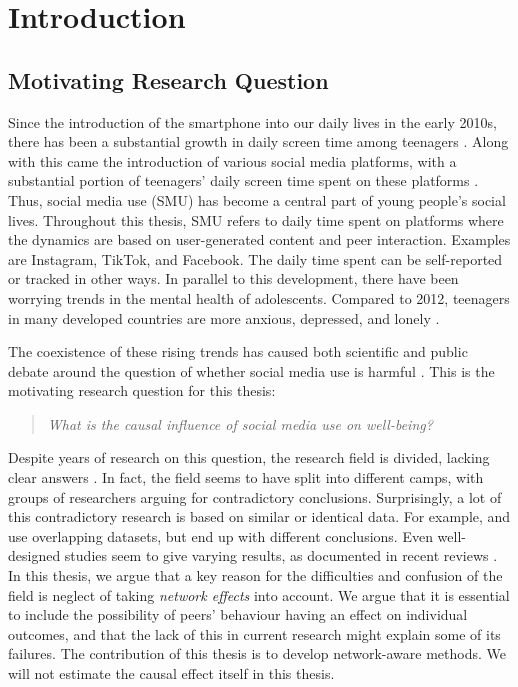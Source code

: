 
\chapter{Introduction}
\label{chap:introduction}
\section{Motivating Research Question}
\label{sec:intro:motivation}
Since the introduction of the smartphone into our daily lives in the early 2010s, there has been a substantial growth in daily screen time among teenagers \parencite{Twenge2018}. Along with this came the introduction of various social media platforms, with a substantial portion of teenagers' daily screen time spent on these platforms \parencite{Twenge2018}. Thus, social media use (SMU) has become a central part of young people's social lives. Throughout this thesis, SMU refers to daily time spent on platforms where the dynamics are based on user-generated content and peer interaction. Examples are Instagram, TikTok, and Facebook. The daily time spent can be self-reported or tracked in other ways. In parallel to this development, there have been worrying trends in the mental health of adolescents. Compared to 2012, teenagers in many developed countries are more anxious, depressed, and lonely \parencite{Twenge2018, Haidt2024}.

The coexistence of these rising trends has caused both scientific and public debate around the question of whether social media use is harmful \parencite{Valkenburg2022}. This is the motivating research question for this thesis:

\begin{quote}
\emph{What is the causal influence of social media use on well-being?}
\end{quote}

Despite years of research on this question, the research field is divided, lacking clear answers \parencite{Valkenburg2022}. In fact, the field seems to have split into different camps, with groups of researchers arguing for contradictory conclusions. Surprisingly, a lot of this contradictory research is based on similar or identical data. For example, \textcite{Twenge2018} and \textcite{Orben2019} use overlapping datasets, but end up with different conclusions. Even well-designed studies seem to give varying results, as documented in recent reviews \parencite{Valkenburg2022}. In this thesis, we argue that a key reason for the difficulties and confusion of the field is neglect of taking \emph{network effects} into account. We argue that it is essential to include the possibility of peers' behaviour having an effect on individual outcomes, and that the lack of this in current research might explain some of its failures. The contribution of this thesis is to develop network-aware methods. We will not estimate the causal effect itself in this thesis.

